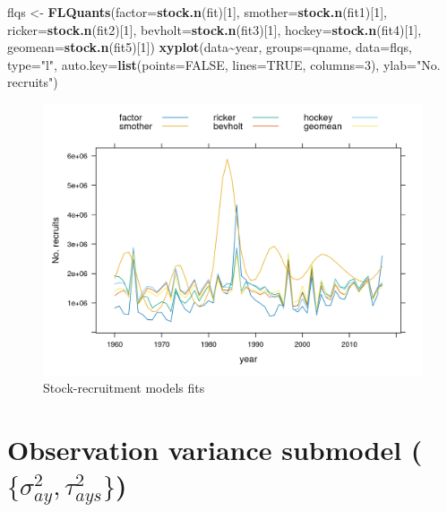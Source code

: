 \documentclass[
]{book}
\newenvironment{Shaded}{\begin{snugshade}}{\end{snugshade}}
\newcommand{\AttributeTok}[1]{\textcolor[rgb]{0.13,0.29,0.53}{#1}}
\newcommand{\ConstantTok}[1]{\textcolor[rgb]{0.56,0.35,0.01}{#1}}
\newcommand{\DecValTok}[1]{\textcolor[rgb]{0.00,0.00,0.81}{#1}}
\newcommand{\FunctionTok}[1]{\textcolor[rgb]{0.13,0.29,0.53}{\textbf{#1}}}
\newcommand{\NormalTok}[1]{#1}
\newcommand{\OtherTok}[1]{\textcolor[rgb]{0.56,0.35,0.01}{#1}}
\newcommand{\SpecialCharTok}[1]{\textcolor[rgb]{0.81,0.36,0.00}{\textbf{#1}}}
\newcommand{\StringTok}[1]{\textcolor[rgb]{0.31,0.60,0.02}{#1}}
\begin{document}
\begin{Shaded}
\begin{Highlighting}[]
\NormalTok{flqs }\OtherTok{\textless{}{-}} \FunctionTok{FLQuants}\NormalTok{(}\AttributeTok{factor=}\FunctionTok{stock.n}\NormalTok{(fit)[}\DecValTok{1}\NormalTok{], }\AttributeTok{smother=}\FunctionTok{stock.n}\NormalTok{(fit1)[}\DecValTok{1}\NormalTok{], }\AttributeTok{ricker=}\FunctionTok{stock.n}\NormalTok{(fit2)[}\DecValTok{1}\NormalTok{], }\AttributeTok{bevholt=}\FunctionTok{stock.n}\NormalTok{(fit3)[}\DecValTok{1}\NormalTok{], }\AttributeTok{hockey=}\FunctionTok{stock.n}\NormalTok{(fit4)[}\DecValTok{1}\NormalTok{], }\AttributeTok{geomean=}\FunctionTok{stock.n}\NormalTok{(fit5)[}\DecValTok{1}\NormalTok{])}
\FunctionTok{xyplot}\NormalTok{(data}\SpecialCharTok{\textasciitilde{}}\NormalTok{year, }\AttributeTok{groups=}\NormalTok{qname, }\AttributeTok{data=}\NormalTok{flqs, }\AttributeTok{type=}\StringTok{"l"}\NormalTok{, }\AttributeTok{auto.key=}\FunctionTok{list}\NormalTok{(}\AttributeTok{points=}\ConstantTok{FALSE}\NormalTok{, }\AttributeTok{lines=}\ConstantTok{TRUE}\NormalTok{, }\AttributeTok{columns=}\DecValTok{3}\NormalTok{), }\AttributeTok{ylab=}\StringTok{"No. recruits"}\NormalTok{)}
\end{Highlighting}
\end{Shaded}

\begin{figure}
\centering
\includegraphics{_bookdown_files/_main_files/figure-html/srmod-1.png}
\caption{\label{fig:srmod}Stock-recruitment models fits}
\end{figure}

\hypertarget{observation-variance-submodel-sigma2_ay-tau2_ays}{%
\section{\texorpdfstring{Observation variance submodel (\(\{\sigma^2_{ay}, \tau^2_{ays}\}\))}{Observation variance submodel (\textbackslash\{\textbackslash sigma\^{}2\_\{ay\}, \textbackslash tau\^{}2\_\{ays\}\textbackslash\})}}\label{observation-variance-submodel-sigma2_ay-tau2_ays}}
\end{document}
